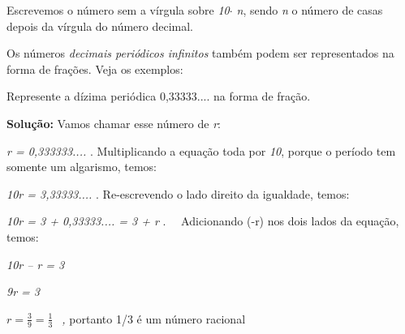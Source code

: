 \begin{caixa}
\begin{Center}
Escrevemos o número sem a vírgula sobre \textit{10$ \cdot $ n}, sendo \textit{n} o número de casas depois da vírgula do número decimal.
\end{Center}
\end{caixa}

\begin{justify}
Os números \textit{decimais periódicos infinitos} também podem ser representados na forma de frações. Veja os exemplos:
\end{justify}

\begin{texemplo}
Represente a dízima periódica 0,33333.... na forma de fração.


\begin{justify}
\textbf{Solução: }Vamos chamar esse número de \textit{r}:
\end{justify}


\begin{justify}
\quad \textit{r = 0,333333....} . Multiplicando a equação toda por \textit{10}, porque o período tem somente um algarismo, temos:
\end{justify}

\begin{justify}
\quad \textit{10r = 3,33333....} . Re-escrevendo o lado direito da igualdade, temos:
\end{justify}

\begin{justify}
\quad \textit{10r = 3 + 0,33333.... = 3 + r} .~~ Adicionando (-r) nos dois lados da equação, temos:
\end{justify}

\begin{justify}
\quad \textit{10r – r = 3}
\end{justify}

\begin{justify}
\quad \textit{9r = 3}
\end{justify}

\begin{justify}
\quad  \( r=\frac{3}{9}=\frac{1}{3}~~ \) \textit{, }portanto 1/3 é um número racional\textit{ \qedsymbol{}}
\end{justify}
\end{texemplo}

